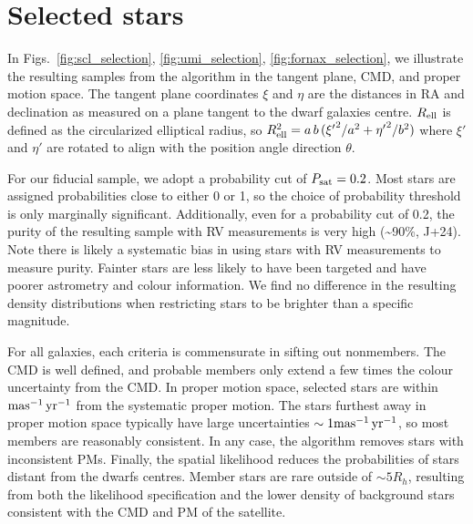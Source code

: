 \section{Selected stars}\label{selected-stars}

In
Figs.~\ref{fig:scl_selection}, \ref{fig:umi_selection}, \ref{fig:fornax_selection},
we illustrate the resulting samples from the algorithm in the tangent
plane, CMD, and proper motion space. The tangent plane coordinates
\(\xi\) and \(\eta\) are the distances in RA and declination as measured
on a plane tangent to the dwarf galaxies centre. \(R_{\rm ell}\) is
defined as the circularized elliptical radius, so
\(R_{\rm ell}^2 = a\,b\,({\xi'}^2 / a^2 + {\eta'}^2 / b^2)\) where
\(\xi'\) and \(\eta'\) are rotated to align with the position angle
direction \(\theta\).

For our fiducial sample, we adopt a probability cut of
\(P_{\rm sat} = 0.2\). Most stars are assigned probabilities close to
either 0 or 1, so the choice of probability threshold is only marginally
significant. Additionally, even for a probability cut of 0.2, the purity
of the resulting sample with RV measurements is very high
(\textasciitilde90\%, J+24). Note there is likely a systematic bias in
using stars with RV measurements to measure purity. Fainter stars are
less likely to have been targeted and have poorer astrometry and colour
information. We find no difference in the resulting density
distributions when restricting stars to be brighter than a specific
magnitude.

For all galaxies, each criteria is commensurate in sifting out
nonmembers. The CMD is well defined, and probable members only extend a
few times the colour uncertainty from the CMD. In proper motion space,
selected stars are within \({\rm mas^{-1}\,yr^{-1}}\) from the systematic proper motion.
The stars furthest away in proper motion space typically have large
uncertainties \(\sim 1{\rm mas^{-1}\,yr^{-1}}\), so most members are reasonably
consistent. In any case, the algorithm removes stars with inconsistent
PMs. Finally, the spatial likelihood reduces the probabilities of stars
distant from the dwarfs centres. Member stars are rare outside of
\(\sim5R_h\), resulting from both the likelihood specification and the
lower density of background stars consistent with the CMD and PM of the
satellite.

